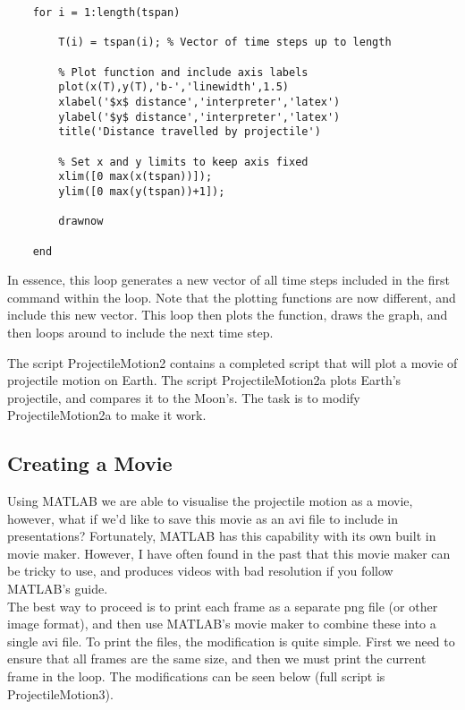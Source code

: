\documentclass[12pt]{report}
\begin{document}
\begin{lstlisting}
    for i = 1:length(tspan)
    
        T(i) = tspan(i); % Vector of time steps up to length
        
        % Plot function and include axis labels
        plot(x(T),y(T),'b-','linewidth',1.5)
        xlabel('$x$ distance','interpreter','latex')
        ylabel('$y$ distance','interpreter','latex')
        title('Distance travelled by projectile')
        
        % Set x and y limits to keep axis fixed
        xlim([0 max(x(tspan))]); 
        ylim([0 max(y(tspan))+1]);
        
        drawnow
        
    end
\end{lstlisting}

\noindent In essence, this loop generates a new vector of all time steps included in the first command within the loop. Note that the plotting functions are now different, and include this new vector. This loop then plots the function, draws the graph, and then loops around to include the next time step.\\

\begin{tcolorbox}[title=Task (Moderate)]
The script ProjectileMotion2 contains a completed script that will plot a movie of projectile motion on Earth. The script ProjectileMotion2a plots Earth's projectile, and compares it to the Moon's. The task is to modify ProjectileMotion2a to make it work.
\end{tcolorbox}

\subsection*{Creating a Movie}
Using MATLAB we are able to visualise the projectile motion as a movie, however, what if we'd like to save this movie as an avi file to include in presentations? Fortunately, MATLAB has this capability with its own built in movie maker. However, I have often found in the past that this movie maker can be tricky to use, and produces videos with bad resolution if you follow MATLAB's guide.\\

\noindent The best way to proceed is to print each frame as a separate png file (or other image format), and then use MATLAB's movie maker to combine these into a single avi file. To print the files, the modification is quite simple. First we need to ensure that all frames are the same size, and then we must print the current frame in the loop. The modifications can be seen below (full script is ProjectileMotion3).
\end{document}
